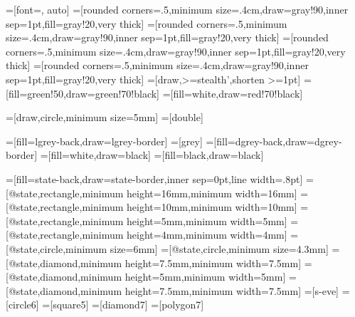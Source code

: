 \usepackage{xspace}
\usetikzlibrary{arrows}
\usetikzlibrary{automata}
\usetikzlibrary{shapes,snakes}
\usetikzlibrary{calc}
\usetikzlibrary{patterns}
\usetikzlibrary{shapes.geometric}
\usetikzlibrary{positioning}
=[font=\small, auto]
=[rounded corners=.5,minimum size=.4cm,draw=gray!90,inner sep=1pt,fill=gray!20,very thick]
=[rounded corners=.5,minimum size=.4cm,draw=gray!90,inner sep=1pt,fill=gray!20,very thick]
=[rounded corners=.5,minimum size=.4cm,draw=gray!90,inner sep=1pt,fill=gray!20,very thick]
=[rounded corners=.5,minimum size=.4cm,draw=gray!90,inner sep=1pt,fill=gray!20,very thick]
=[draw,>=stealth',shorten >=1pt]
=[fill=green!50,draw=green!70!black]
=[fill=white,draw=red!70!black]

=[draw,circle,minimum size=5mm]
=[double]




=[fill=lgrey-back,draw=lgrey-border]
=[grey]
=[fill=dgrey-back,draw=dgrey-border]
=[fill=white,draw=black]
=[fill=black,draw=black]

=[fill=state-back,draw=state-border,inner sep=0pt,line width=.8pt]
=[@state,rectangle,minimum height=16mm,minimum width=16mm]
=[@state,rectangle,minimum height=10mm,minimum width=10mm]
=[@state,rectangle,minimum height=5mm,minimum width=5mm]
=[@state,rectangle,minimum height=4mm,minimum width=4mm]
=[@state,circle,minimum size=6mm]
=[@state,circle,minimum size=4.3mm]
=[@state,diamond,minimum height=7.5mm,minimum width=7.5mm]
=[@state,diamond,minimum height=5mm,minimum width=5mm]
=[@state,diamond,minimum height=7.5mm,minimum width=7.5mm]
=[s-eve]
=[circle6]
=[square5]
=[diamond7]
=[polygon7]
\tikzset{node distance=2.5cm}

